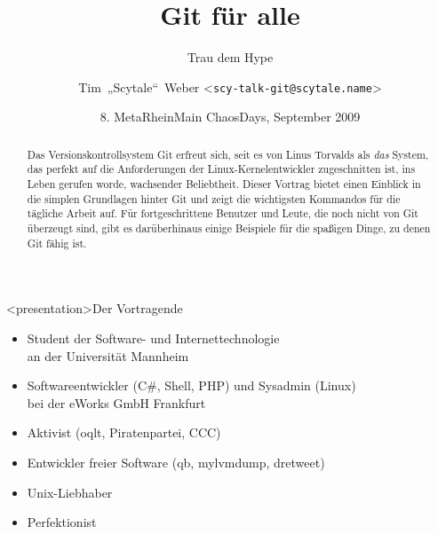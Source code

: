 

\title{Git für alle}
\subtitle{Trau dem Hype}
\author[Tim~„Scytale“~Weber]{Tim~„Scytale“~Weber <\texttt{scy-talk-git@scytale.name}>}
\date[MRMCD 0x08h]{8. MetaRheinMain ChaosDays, September 2009}
\UseOverviews
\def\HW{{\color{red}$^\star$}}



\begin{frame}\maketitle\end{frame}

\begin{abstract}
Das Versionskontrollsystem Git erfreut sich, seit es von Linus Torvalds als \emph{das} System, das perfekt auf die Anforderungen der Linux-Kernel\-entwickler zugeschnitten ist, ins Leben gerufen worde, wachsender Beliebtheit.
Dieser Vortrag bietet einen Einblick in die simplen Grundlagen hinter Git und zeigt die wichtigsten Kommandos für die tägliche Arbeit auf.
Für fortgeschrittene Benutzer und Leute, die noch nicht von Git überzeugt sind, gibt es darüberhinaus einige Beispiele für die spaßigen Dinge, zu denen Git fähig ist.
\end{abstract}

\begin{frame}<presentation>{Der Vortragende}
\begin{itemize}
	\item Student der Software- und Internettechnologie\\an der Universität Mannheim
	\item Softwareentwickler (C\#, Shell, PHP) und Sysadmin (Linux)\\bei der eWorks GmbH Frankfurt
	\item Aktivist (oqlt, Piratenpartei, CCC)
	\item Entwickler freier Software (qb, mylvmdump, dretweet)
	\item Unix-Liebhaber
	\item Perfektionist
\end{itemize}
\end{frame}

\tableofcontents



